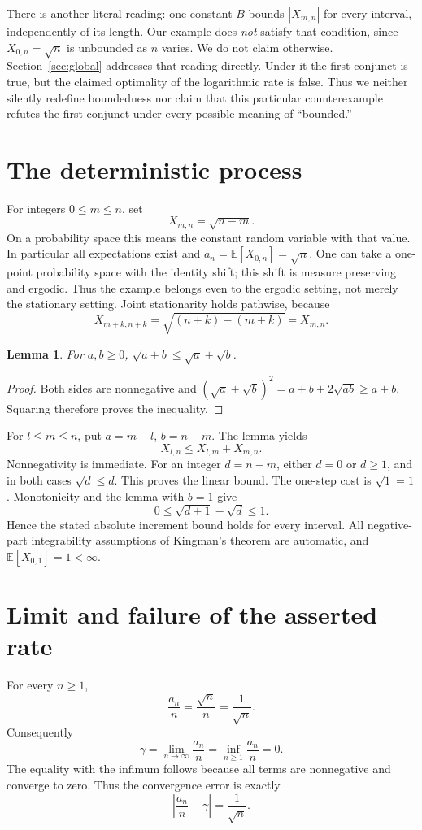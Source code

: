 \documentclass[11pt]{article}
\newtheorem{lemma}[theorem]{Lemma}
\begin{document}
There is another literal reading: one constant $B$ bounds $|X_{m,n}|$ for
every interval, independently of its length. Our example does \emph{not}
satisfy that condition, since $X_{0,n}=\sqrt n$ is unbounded as $n$ varies.
We do not claim otherwise. Section~\ref{sec:global} addresses that reading
directly. Under it the first conjunct is true, but the claimed optimality
of the logarithmic rate is false. Thus we neither silently redefine
boundedness nor claim that this particular counterexample refutes the
first conjunct under every possible meaning of ``bounded.''

\section{The deterministic process}
For integers $0\le m\le n$, set
\[X_{m,n}=\sqrt{n-m}.\]
On a probability space this means the constant random variable with that
value. In particular all expectations exist and
$a_n=\mathbb E[X_{0,n}]=\sqrt n$. One can take a one-point probability
space with the identity shift; this shift is measure preserving and
ergodic. Thus the example belongs even to the ergodic setting, not merely
the stationary setting. Joint stationarity holds pathwise, because
\[X_{m+k,n+k}=\sqrt{(n+k)-(m+k)}=X_{m,n}.\]

\begin{lemma}
For $a,b\ge0$, $\sqrt{a+b}\le\sqrt a+\sqrt b$.
\end{lemma}
\begin{proof}
Both sides are nonnegative and
$(\sqrt a+\sqrt b)^2=a+b+2\sqrt{ab}\ge a+b$.
Squaring therefore proves the inequality.
\end{proof}
For $l\le m\le n$, put $a=m-l$, $b=n-m$. The lemma yields
\[X_{l,n}\le X_{l,m}+X_{m,n}.\]
Nonnegativity is immediate. For an integer $d=n-m$, either $d=0$ or
$d\ge1$, and in both cases $\sqrt d\le d$. This proves the linear bound.
The one-step cost is $\sqrt1=1$. Monotonicity and the lemma with $b=1$
give
\[0\le\sqrt{d+1}-\sqrt d\le1.\]
Hence the stated absolute increment bound holds for every interval.
All negative-part integrability assumptions of Kingman's theorem are
automatic, and $\mathbb E[X_{0,1}]=1<\infty$.

\section{Limit and failure of the asserted rate}
For every $n\ge1$,
\[\frac{a_n}{n}=\frac{\sqrt n}{n}=\frac1{\sqrt n}.
\]
Consequently
\[\gamma=\lim_{n\to\infty}\frac{a_n}{n}
  =\inf_{n\ge1}\frac{a_n}{n}=0.
\]
The equality with the infimum follows because all terms are nonnegative
and converge to zero. Thus the convergence error is exactly
\[\left|\frac{a_n}{n}-\gamma\right|=\frac1{\sqrt n}.
\]
\end{document}
